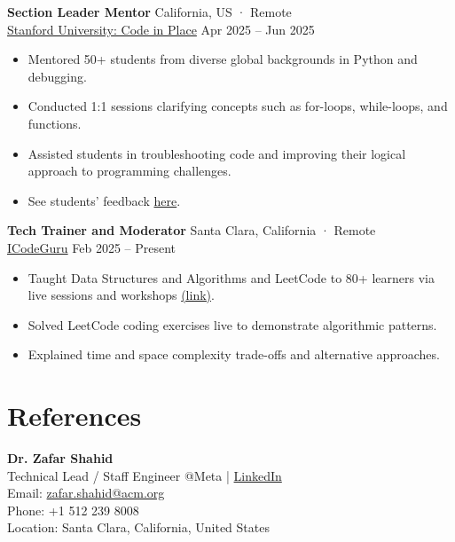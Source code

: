 \documentclass[a4paper,12pt]{article}
\begin{document}
\textbf{Section Leader Mentor} \hfill California, US · Remote \\
\href{https://codeinplace.stanford.edu/}{Stanford University: Code in Place} \hfill Apr 2025 -- Jun 2025
\begin{itemize}[leftmargin=*]
    \item Mentored 50+ students from diverse global backgrounds in Python and debugging.
    \item Conducted 1:1 sessions clarifying concepts such as for-loops, while-loops, and functions.
    \item Assisted students in troubleshooting code and improving their logical approach to programming challenges.
    \item See students’ feedback \href{https://media.licdn.com/dms/image/v2/D4D2DAQH_89FutFda4w/profile-treasury-image-shrink_8192_8192/B4DZfE6yljGUAg-/0/1751355439025?e=1756393200&v=beta&t=n1DErPPd6YfASzT0V4SyNly1bj7Gohi6x4FmvWfIecI}{here}.
\end{itemize}

\vspace{0.5em}

\textbf{Tech Trainer and Moderator} \hfill Santa Clara, California · Remote \\
\href{https://icode.guru/}{ICodeGuru} \hfill Feb 2025 -- Present
\begin{itemize}[leftmargin=*]
    \item Taught Data Structures and Algorithms and LeetCode to 80+ learners via live sessions and workshops \href{https://github.com/Qasim-Gill/Volunteer-Teaching-and-Mentorship}{(link)}.
    \item Solved LeetCode coding exercises live to demonstrate algorithmic patterns.
    \item Explained time and space complexity trade-offs and alternative approaches.
\end{itemize}


\section{References}

\textbf{Dr. Zafar Shahid} \\
Technical Lead / Staff Engineer @Meta | \href{https://www.linkedin.com/in/zafarshahid/}{LinkedIn} \\
Email: \href{mailto:zafar.shahid@acm.org}{zafar.shahid@acm.org} \\
Phone: +1 512 239 8008 \\
Location: Santa Clara, California, United States
\end{document}
